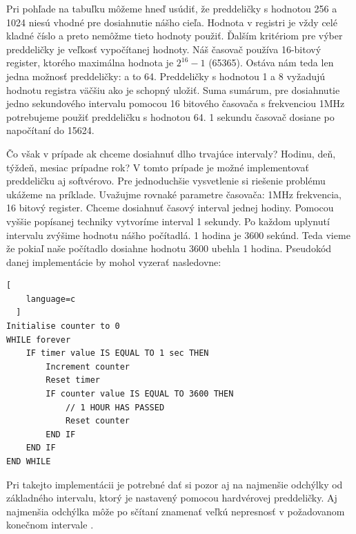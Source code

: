 Pri pohľade na tabuľku môžeme hneď usúdiť, že preddeličky s hodnotou 256 a 1024 niesú vhodné pre dosiahnutie nášho cieľa. Hodnota v registri je vždy celé kladné číslo a preto nemôžme tieto hodnoty použiť. Ďalším kritériom pre výber preddeličky je veľkosť
vypočítanej hodnoty. Náš časovač používa 16-bitový register, ktorého maximálna hodnota je $2^{16} -1$ (65365).
Ostáva nám teda len jedna možnosť preddeličky: a to 64. Preddeličky s hodnotou 1 a 8 vyžadujú hodnotu registra väčšiu ako je schopný uložiť.
Suma sumárum, pre dosiahnutie jedno sekundového intervalu pomocou 16 bitového časovača s frekvenciou 1MHz potrebujeme použiť preddeličku s hodnotou 64.
1 sekundu časovač dosiane po napočítaní do 15624. \par
Čo však v prípade ak chceme dosiahnuť dlho trvajúce intervaly? Hodinu, deň, týždeň, mesiac prípadne rok?
V tomto prípade je možné implementovať preddeličku aj softvérovo. Pre jednoduchšie vysvetlenie si riešenie problému ukážeme na príklade. Uvažujme rovnaké parametre časovača: 1MHz frekvencia, 16 bitový register. Chceme dosiahnuť časový interval jednej hodiny. Pomocou vyššie popísanej techniky vytvoríme interval 1 sekundy.
Po každom uplynutí intervalu zvýšime hodnotu nášho počítadlá. 1 hodina je 3600 sekúnd. Teda vieme že pokiaľ naše počítadlo dosiahne hodnotu 3600 ubehla 1 hodina.
Pseudokód danej implementácie by mohol vyzerať nasledovne:
\begin{lstlisting}[
    language=c
  ]  
Initialise counter to 0
WHILE forever
    IF timer value IS EQUAL TO 1 sec THEN
        Increment counter
        Reset timer
        IF counter value IS EQUAL TO 3600 THEN
            // 1 HOUR HAS PASSED
            Reset counter
        END IF
    END IF
END WHILE
\end{lstlisting}
Pri takejto implementácii je potrebné dať si pozor aj na najmenšie odchýlky od základného intervalu, ktorý je nastavený pomocou hardvérovej preddeličky.
Aj najmenšia odchýlka môže po sčítaní znamenať veľkú nepresnosť v požadovanom konečnom intervale \cite{cameraNewbieGuideAVR2015}.

